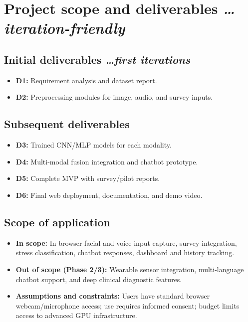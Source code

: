 \documentclass[11pt,a4paper]{article}
\newcommand{\BvrHint}[1]{%
  {\normalfont\normalsize\itshape\hfill #1}}
\begin{document}
\section{Project scope and deliverables %
\BvrHint{\ldots iteration-friendly}}
\subsection{Initial deliverables %
\BvrHint{\ldots first iterations}}
\begin{itemize}[leftmargin=0.7cm]
    \item \textbf{D1:} Requirement analysis and dataset report.
    \item \textbf{D2:} Preprocessing modules for image, audio, and survey inputs.
\end{itemize}

\subsection{Subsequent deliverables}
\begin{itemize}[leftmargin=0.7cm]
    \item \textbf{D3:} Trained CNN/MLP models for each modality.
    \item \textbf{D4:} Multi-modal fusion integration and chatbot prototype.
    \item \textbf{D5:} Complete MVP with survey/pilot reports.
    \item \textbf{D6:} Final web deployment, documentation, and demo video.
\end{itemize}

\subsection{Scope of application}
\begin{itemize}[leftmargin=0.7cm]
    \item \textbf{In scope:} In-browser facial and voice input capture, survey integration, stress classification, chatbot responses, dashboard and history tracking.
    \item \textbf{Out of scope (Phase 2/3):} Wearable sensor integration, multi-language chatbot support, and deep clinical diagnostic features.
    \item \textbf{Assumptions and constraints:} Users have standard browser webcam/microphone access; use requires informed consent; budget limits access to advanced GPU infrastructure.
\end{itemize}
\end{document}
